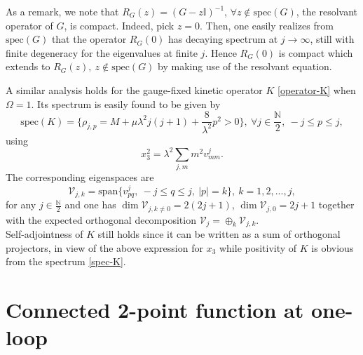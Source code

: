 \documentclass[a4paper,11pt,twoside]{article}
\numberwithin{equation}{section}
\newcommand\bbone{{ \mathbb{I}}}
\theoremstyle{nonumberplain}
\newcounter{and}
\begin{document}
As a remark, we note that $R_G(z)=(G-z\bbone)^{-1}$, $\forall z\notin\text{spec}(G)$, the resolvant operator of $G$, is compact. Indeed, pick $z=0$. Then, one easily realizes from $\text{spec}(G)$ that the operator $R_G(0)$ has decaying spectrum at $j\to\infty$, still with finite degeneracy for the eigenvalues at finite $j$. Hence $R_G(0)$ is compact which extends to $R_G(z),\ z\notin\text{spec}(G)$ by making use of the resolvant equation.\par%

A similar analysis holds for the gauge-fixed kinetic operator $K$ \eqref{operator-K} when $\Omega=1$. Its spectrum is easily found to be given by
%
\begin{equation}
\text{spec}(K) = \{ \rho_{j,p} = M + \mu \lambda^2 j(j+1) + \frac{8}{\lambda^2} p^2>0 \},\ \forall j \in \frac{\mathbb{N}}{2} , \ -j \le p \le j, \label{spec-K} 
\end{equation}
using 
\begin{equation*}
x_3^2 = \lambda^2 \sum_{j,m} m^2 v^j_{mm}.
\end{equation*}
The corresponding eigenspaces are
\begin{equation}
\mathcal{V}_{j,k} = \text{span}\{v^j_{pq},\ -j \le q \le j,\ \vert p\vert=k \},\ k=1,2,...,j\label{eigensp-K},
\end{equation}
for any $j \in \frac{\mathbb{N}}{2}$ and one has $\dim\mathcal{V}_{j,k\ne0}=2(2j+1)$, $\dim\mathcal{V}_{j,0}=2j+1$ together with the expected orthogonal decomposition $\mathcal{V}_j=\oplus_k\mathcal{V}_{j,k}$. \\
Self-adjointness of $K$ still holds since it can be written as a sum of orthogonal projectors, in view of the above expression for $x_3$ while positivity of $K$ is obvious from the spectrum \eqref{spec-K}.\par%

\section{Connected 2-point function at one-loop}\label{2-point-comput}
\end{document}
